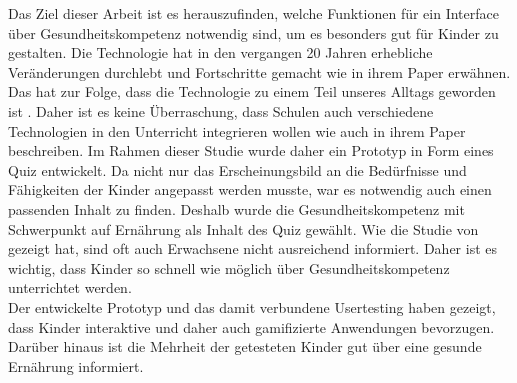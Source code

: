 Das Ziel dieser Arbeit ist es herauszufinden, welche Funktionen für ein Interface über Gesundheitskompetenz notwendig sind, um es besonders gut für Kinder zu gestalten.  
Die Technologie hat in den vergangen 20 Jahren erhebliche Veränderungen durchlebt und Fortschritte gemacht wie \textcite{walker2000screen, sharmin2012effect} in ihrem Paper erwähnen. Das hat zur Folge, dass die Technologie zu einem Teil unseres Alltags geworden ist \autocite{gikas2013mobile, gossen2012search}. Daher ist es keine Überraschung, dass Schulen auch verschiedene Technologien in den Unterricht integrieren wollen wie \textcite{walker2000screen} auch in ihrem Paper beschreiben.  
Im Rahmen dieser Studie wurde daher ein Prototyp in Form eines Quiz entwickelt. Da nicht nur das Erscheinungsbild an die Bedürfnisse und Fähigkeiten der Kinder angepasst werden musste, war es notwendig auch einen passenden Inhalt zu finden. Deshalb wurde die Gesundheitskompetenz mit Schwerpunkt auf Ernährung als Inhalt des Quiz gewählt. Wie die Studie von \textcite{jordan2015gesundheitskompetenz} gezeigt hat, sind oft auch Erwachsene nicht ausreichend informiert. Daher ist es wichtig, dass Kinder so schnell wie möglich über Gesundheitskompetenz unterrichtet werden. \\
Der entwickelte Prototyp und das damit verbundene Usertesting haben gezeigt, dass Kinder interaktive und daher auch gamifizierte Anwendungen bevorzugen. Darüber hinaus ist die Mehrheit der getesteten Kinder gut über eine gesunde Ernährung informiert.
